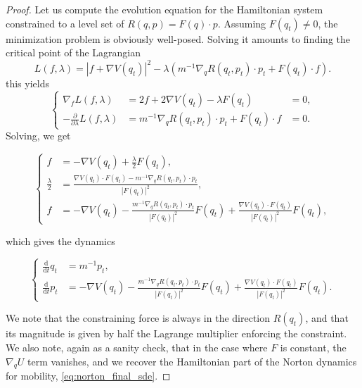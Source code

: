 \begin{proof}
    \label{ex:constrained_dynamics}
    Let us compute the evolution equation for the Hamiltonian system constrained to a level set of $R(q,p)=F(q)\cdot p$.
    Assuming $F(q_t)\neq 0$, the minimization problem is obviously well-posed. Solving it amounts to finding the critical point of the Lagrangian
    \[L(f,\lambda)=|f+\nabla V(q_t)|^2-\lambda (m^{-1}\nabla_q R(q_t,p_t)\cdot p_t +F(q_t)\cdot f).\]
    this yields 
    \begin{equation}
        \left\{
            \begin{aligned}
                \nabla_f L(f,\lambda)&=2f+2\nabla V(q_t)-\lambda F(q_t)&=0,\\
                -\frac{\partial}{\partial \lambda}L(f,\lambda)&=m^{-1}\nabla_q R(q_t,p_t)\cdot p_t +F(q_t)\cdot f&=0.
            \end{aligned}
        \right.
    \end{equation}
Solving, we get 

\begin{equation}
    \left\{
        \begin{aligned}
            f&=-\nabla V(q_t)+\frac\lambda2 F(q_t),\\
            \frac\lambda2&=\frac{\nabla V(q_t)\cdot F(q_t)-m^{-1}\nabla_q R(q_t,p_t)\cdot p_t}{|F(q_t)|^2},\\
            f&  =-\nabla V(q_t)-\frac{m^{-1}\nabla_q R(q_t,p_t)\cdot p_t}{|F(q_t)|^2}F(q_t)+\frac{\nabla V(q_t)\cdot F(q_t)}{|F(q_t)|^2}F(q_t),
        \end{aligned}
    \right.
\end{equation}

which gives the dynamics

\begin{equation}
    \label{eq:nonholonomic_constrained_dynamics}
    \left\{\begin{aligned}
    \frac{\mathrm{d}}{\mathrm{d}t}q_t&=m^{-1}p_t,\\
    \frac{\mathrm{d}}{\mathrm{d}t}p_t&=-\nabla V(q_t)-\frac{m^{-1}\nabla_q R(q_t,p_t)\cdot p_t}{|F(q_t)|^2}F(q_t)+\frac{\nabla V(q_t)\cdot F(q_t)}{|F(q_t)|^2}F(q_t).
    \end{aligned}\right.
\end{equation}

We note that the constraining force is always in the direction $R(q_t)$, and that its magnitude is given by half the Lagrange multiplier enforcing the constraint.
We also note, again as a sanity check, that in the case where $F$ is constant, the $\nabla_q U$ term vanishes, and we recover the Hamiltonian part of the Norton dynamics for mobility, \eqref{eq:norton_final_sde}.
\end{proof}


